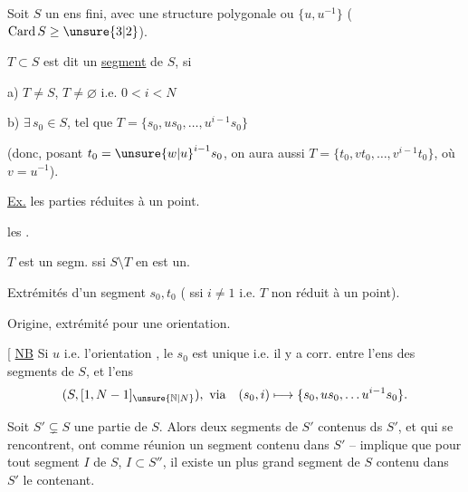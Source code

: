 Soit $S$ un ens fini, avec une structure polygonale ou  $\{u,u^{-1}\}$ ($\mathrm{Card}\,S\geq\unsure{3|2}$).

 $T\subset S$  est dit un  \uline{segment} de $S$, si

a)  $T\ne S$, $T\ne\varnothing$  i.e. $0<i<N$

b) $\exists\,s_0\in S$,  tel que $T=\{s_0,us_0,\ldots,u^{i-1}s_0\}$

(donc, posant $t_0={\unsure{w|u}}^{i-1}s_0$, on aura aussi $T=\{t_0,vt_0,\ldots,v^{i-1}t_0\}$, où $v=u^{-1}$).

\uline{Ex.} les parties réduites à un point.

les .


$T$ est un segm. ssi $S\setminus T$ en est un.



Extrémités d'un segment $s_0,t_0$ ( ssi $i\ne1$ i.e. $T$ non réduit à un point).

Origine, extrémité pour une  orientation.

[ \uline{NB} Si $u$ i.e. l'orientation , le $s_0$ est unique i.e. il y a corr.  entre l'ens des segments de $S$, et l'ens
\[
 (S,[1,N-1]_{\unsure{\mathbb N|N}}),\ \text{via}\quad (s_0,i)\longmapsto\{s_0,us_0,\ldots u^{i-1}s_0\}.
\]

Soit $S'\subsetneq S$ une partie de $S$. Alors  deux segments de $S'$ contenus ds $S'$, et qui se rencontrent, ont comme réunion un segment  contenu dans $S'$ --  implique
que pour tout segment $I$ de $S$, $I\subset S''$, il existe un plus grand segment de $S$ contenu dans $S'$ le contenant.

